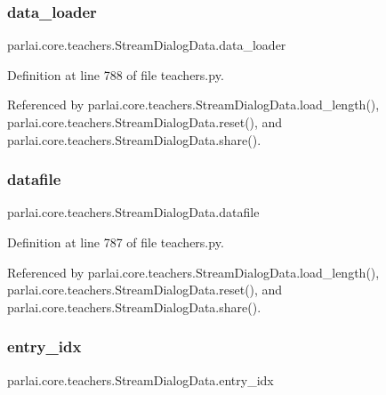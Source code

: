 \subsubsection{\texorpdfstring{data\+\_\+loader}{data\_loader}}
{\footnotesize\ttfamily parlai.\+core.\+teachers.\+Stream\+Dialog\+Data.\+data\+\_\+loader}



Definition at line 788 of file teachers.\+py.



Referenced by parlai.\+core.\+teachers.\+Stream\+Dialog\+Data.\+load\+\_\+length(), parlai.\+core.\+teachers.\+Stream\+Dialog\+Data.\+reset(), and parlai.\+core.\+teachers.\+Stream\+Dialog\+Data.\+share().

\mbox{\label{classparlai_1_1core_1_1teachers_1_1StreamDialogData_a4c7f45ba690d0533d6a8c5c0235155b2}} 
\subsubsection{\texorpdfstring{datafile}{datafile}}
{\footnotesize\ttfamily parlai.\+core.\+teachers.\+Stream\+Dialog\+Data.\+datafile}



Definition at line 787 of file teachers.\+py.



Referenced by parlai.\+core.\+teachers.\+Stream\+Dialog\+Data.\+load\+\_\+length(), parlai.\+core.\+teachers.\+Stream\+Dialog\+Data.\+reset(), and parlai.\+core.\+teachers.\+Stream\+Dialog\+Data.\+share().

\mbox{\label{classparlai_1_1core_1_1teachers_1_1StreamDialogData_af239ccfb38c42707c97eb8575fb82f10}} 
\subsubsection{\texorpdfstring{entry\+\_\+idx}{entry\_idx}}
{\footnotesize\ttfamily parlai.\+core.\+teachers.\+Stream\+Dialog\+Data.\+entry\+\_\+idx}



